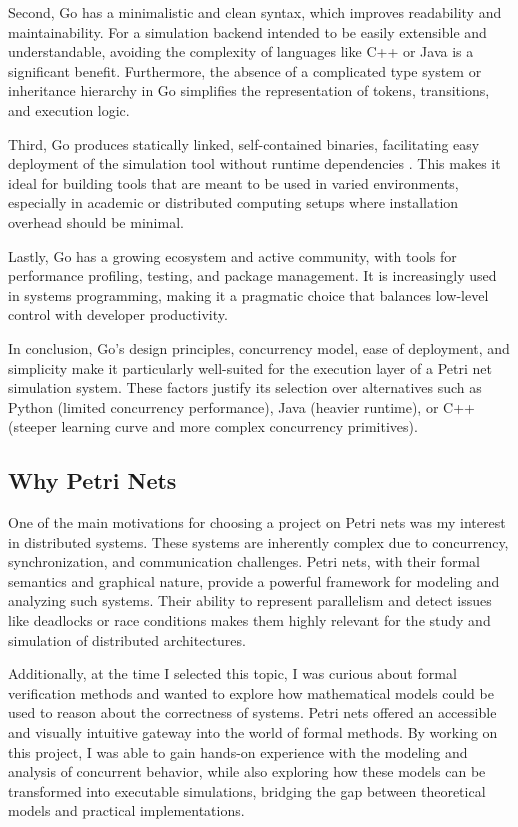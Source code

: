 \documentclass[12pt]{article}
\begin{document}
    Second, Go has a minimalistic and clean syntax, which improves readability and maintainability. For a simulation backend intended to be easily extensible and understandable, avoiding the complexity of languages like C++ or Java is a significant benefit. Furthermore, the absence of a complicated type system or inheritance hierarchy in Go simplifies the representation of tokens, transitions, and execution logic.

    Third, Go produces statically linked, self-contained binaries, facilitating easy deployment of the simulation tool without runtime dependencies \cite{pike2012go}. This makes it ideal for building tools that are meant to be used in varied environments, especially in academic or distributed computing setups where installation overhead should be minimal.

    Lastly, Go has a growing ecosystem and active community, with tools for performance profiling, testing, and package management. It is increasingly used in systems programming, making it a pragmatic choice that balances low-level control with developer productivity.

    In conclusion, Go's design principles, concurrency model, ease of deployment, and simplicity make it particularly well-suited for the execution layer of a Petri net simulation system. These factors justify its selection over alternatives such as Python (limited concurrency performance), Java (heavier runtime), or C++ (steeper learning curve and more complex concurrency primitives).

    \subsection{Why Petri Nets}
    One of the main motivations for choosing a project on Petri nets was my interest in distributed systems. These systems are inherently complex due to concurrency, synchronization, and communication challenges. Petri nets, with their formal semantics and graphical nature, provide a powerful framework for modeling and analyzing such systems. Their ability to represent parallelism and detect issues like deadlocks or race conditions makes them highly relevant for the study and simulation of distributed architectures.

    Additionally, at the time I selected this topic, I was curious about formal verification methods and wanted to explore how mathematical models could be used to reason about the correctness of systems. Petri nets offered an accessible and visually intuitive gateway into the world of formal methods. By working on this project, I was able to gain hands-on experience with the modeling and analysis of concurrent behavior, while also exploring how these models can be transformed into executable simulations, bridging the gap between theoretical models and practical implementations.
\end{document}

